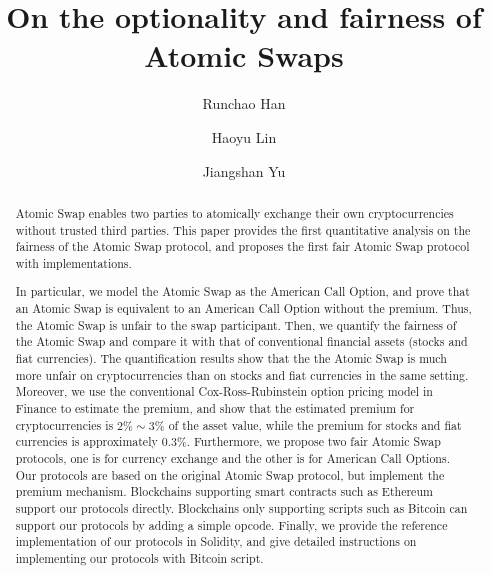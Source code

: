 \documentclass[sigconf, natbib=false]{acmart}
\renewcommand\_{\textunderscore\allowbreak}
\begin{document}
\title{On the optionality and fairness of Atomic Swaps}

\author{Runchao Han}

\author{Haoyu Lin}
\affiliation{%
  \institution{}
}

\author{Jiangshan Yu}

\begin{abstract}
Atomic Swap enables two parties to atomically exchange their own cryptocurrencies without trusted third parties.
This paper provides the first quantitative analysis on the fairness of
the Atomic Swap protocol, and proposes the first fair Atomic Swap
protocol with implementations.

In particular, we model the Atomic Swap as the American Call Option,
and prove that an Atomic Swap is equivalent to an American Call Option
without the premium. Thus, the Atomic Swap is unfair to the swap
participant.  Then, we quantify the fairness of the Atomic Swap and
compare it with that of conventional financial assets (stocks and fiat
currencies).  The quantification results show that the the Atomic Swap
is much more unfair on cryptocurrencies than on stocks and fiat
currencies in the same setting.
Moreover, we use the conventional Cox-Ross-Rubinstein option pricing model in Finance to estimate the premium, and show that the estimated premium for cryptocurrencies is $2\% \sim 3\%$ of the asset value, while the premium for stocks and fiat currencies is approximately $0.3\%$.
Furthermore, we propose two fair Atomic Swap protocols, one is for
currency exchange and the other is for American Call Options. Our
protocols are based on the original Atomic Swap protocol, but
implement the premium mechanism.  Blockchains supporting smart
contracts such as Ethereum support our protocols directly.
Blockchains only supporting scripts such as Bitcoin can support our
protocols by adding a simple opcode.  Finally, we provide the
reference implementation of our protocols in Solidity, and give
detailed instructions on implementing our protocols with Bitcoin
script.
\end{abstract}


\maketitle
\end{document}
